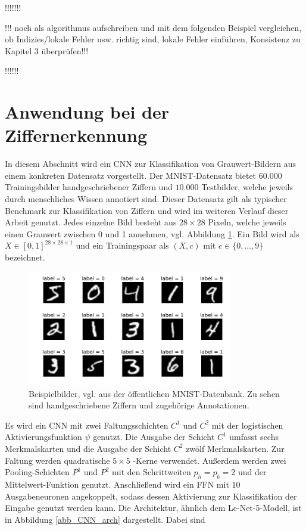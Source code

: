 !!!!!!!

!!! noch als algorithmus aufschreiben und mit dem folgenden Beispiel vergleichen, ob Indizies/lokale Fehler usw. richtig sind, lokale Fehler einführen, Konsistenz zu Kapitel 3 überprüfen!!!

!!!!!!


\section{Anwendung bei der Ziffernerkennung}
In diesem Abschnitt wird ein CNN zur Klassifikation von Grauwert-Bildern aus einem konkreten Datensatz vorgestellt. Der MNIST-Datensatz\cite{DBLP:journals/pieee/LeCunBBH98} bietet $60.000$ Trainingsbilder handgeschriebener Ziffern und $10.000$ Testbilder, welche jeweils durch menschliches Wissen annotiert sind. Dieser Datensatz gilt als typischer Benchmark zur Klassifikation von Ziffern und wird im weiteren Verlauf dieser Arbeit genutzt. Jedes einzelne Bild besteht aus $28 \times 28$ Pixeln, welche jeweils einen Grauwert zwischen 0 und 1 annehmen, vgl. Abbildung \ref{mnistpic}. Ein Bild wird als $X \in [0,1]^{28 \times 28 \times 1}$ und ein Trainingspaar als $(X,c)$ mit $c \in \{0, \ldots, 9\}$ bezeichnet. 

\begin{figure}[h]
    \includegraphics[width=0.8\textwidth]{pics/chapters/CCN/mnist.png}
    \centering
    \caption{Beispielbilder, vgl. \cite{DBLP:journals/pieee/LeCunBBH98} aus der öffentlichen MNIST-Datenbank. Zu sehen sind handgeschriebene Ziffern und zugehörige Annotationen.}
    \label{mnistpic}
\end{figure}

Es wird ein CNN mit zwei Faltungsschichten $C^1$ und $C^2$ mit der logistischen Aktivierungsfunktion $\psi$ genutzt. Die Ausgabe der Schicht $C^1$ umfasst sechs Merkmalskarten und die Ausgabe der Schicht $C^2$ zwölf Merkmalskarten. Zur Faltung werden quadratische $5 \times 5$ -Kerne verwendet. Außerdem werden zwei Pooling-Schichten $P^1$ und $P^2$ mit den Schrittweiten $p_h=p_b=2$ und der Mittelwert-Funktion genutzt. Anschließend wird ein FFN mit 10 Ausgabeneuronen angekoppelt, sodass dessen Aktivierung zur Klassifikation der Eingabe genutzt werden kann. Die Architektur, ähnlich dem Le-Net-5-Modell\cite{DBLP:journals/pieee/LeCunBBH98}, ist in Abbildung \ref{abb_CNN_arch} dargestellt. Dabei sind

